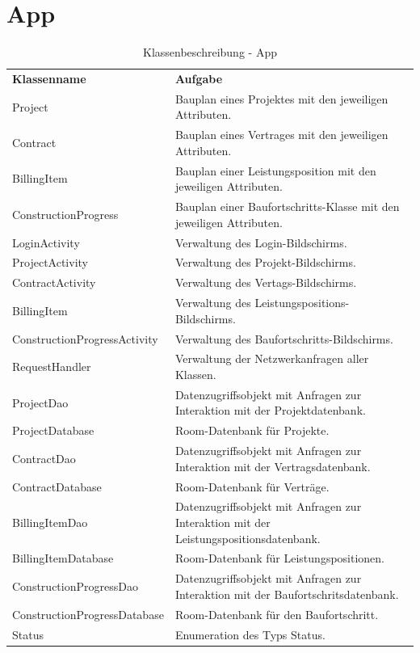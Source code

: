 \clearpage

\section{App}

\begin{table}[h]
	\centering
	\begin{tabularx}{\textwidth}{X X}
		\rowcolor[HTML]{C0C0C0} 
		\textbf{Klassenname} & \textbf{Aufgabe} \\
		Project & Bauplan eines Projektes mit den jeweiligen Attributen.\\
		\rowcolor[HTML]{E7E7E7} 
		Contract & Bauplan eines Vertrages mit den jeweiligen Attributen. \\
		BillingItem & Bauplan einer Leistungsposition mit den jeweiligen Attributen. \\
		\rowcolor[HTML]{E7E7E7} 
		ConstructionProgress & Bauplan einer Baufortschritts-Klasse mit den jeweiligen Attributen. \\
		LoginActivity & Verwaltung des Login-Bildschirms. \\
		\rowcolor[HTML]{E7E7E7} 
		ProjectActivity & Verwaltung des Projekt-Bildschirms. \\
		ContractActivity & Verwaltung des Vertags-Bildschirms. \\
		\rowcolor[HTML]{E7E7E7} 
		BillingItem & Verwaltung des Leistungspositions-Bildschirms. \\
		ConstructionProgressActivity & Verwaltung des Baufortschritts-Bildschirms. \\
		\rowcolor[HTML]{E7E7E7} 
		RequestHandler & Verwaltung der Netzwerkanfragen aller Klassen. \\
		ProjectDao & Datenzugriffsobjekt mit Anfragen zur Interaktion mit der Projektdatenbank. \\
		\rowcolor[HTML]{E7E7E7} 
		ProjectDatabase & Room-Datenbank für Projekte. \\
		ContractDao & Datenzugriffsobjekt mit Anfragen zur Interaktion mit der Vertragsdatenbank. \\
		\rowcolor[HTML]{E7E7E7} 
		ContractDatabase & Room-Datenbank für Verträge. \\
		BillingItemDao & Datenzugriffsobjekt mit Anfragen zur Interaktion mit der Leistungspositionsdatenbank. \\
		\rowcolor[HTML]{E7E7E7} 
		BillingItemDatabase & Room-Datenbank für Leistungspositionen. \\
		ConstructionProgressDao & Datenzugriffsobjekt mit Anfragen zur Interaktion mit der Baufortschritsdatenbank. \\
		\rowcolor[HTML]{E7E7E7} 
		ConstructionProgressDatabase & Room-Datenbank für den Baufortschritt. \\
		Status & Enumeration des Typs Status.
	\end{tabularx}
	\caption{Klassenbeschreibung - App}
	\label{table:klassenbeschreibung-a}
\end{table}

\clearpage